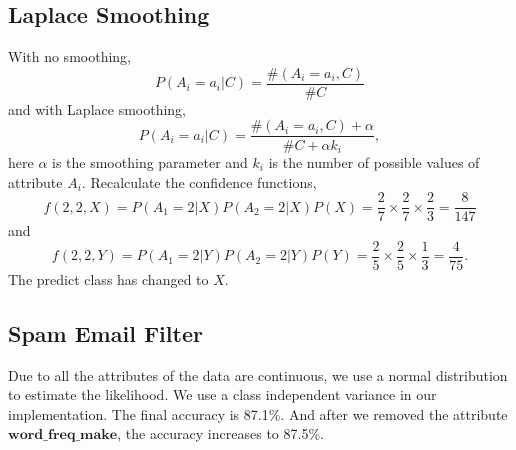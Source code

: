 \documentclass{article}
\begin{document}
\subsection{Laplace Smoothing}
With no smoothing, $$P(A_i=a_i|C)=\frac{\#(A_i=a_i,C)}{\#C}$$ and with Laplace smoothing, $$P(A_i=a_i|C)=\frac{\#(A_i=a_i,C)+\alpha}{\#C+\alpha k_i},$$ here $\alpha$ is the smoothing parameter and $k_i$ is the number of possible values of attribute $A_i$. Recalculate the confidence functions, $$f(2,2,X)=P(A_1=2|X)P(A_2=2|X)P(X)= \frac{2}{7}\times\frac{2}{7}\times\frac{2}{3}=\frac{8}{147}$$ and $$f(2,2,Y)=P(A_1=2|Y)P(A_2=2|Y)P(Y)= \frac{2}{5}\times\frac{2}{5}\times\frac{1}{3}=\frac{4}{75}.$$ The predict class has changed to $X$.

\subsection{Spam Email Filter}
Due to all the attributes of the data are continuous, we use a normal distribution to estimate the likelihood. We use a class independent variance in our implementation. The final accuracy is 87.1\%. And after we removed the attribute $\mathbf{word\_freq\_make}$, the accuracy increases to 87.5\%.
\end{document}
